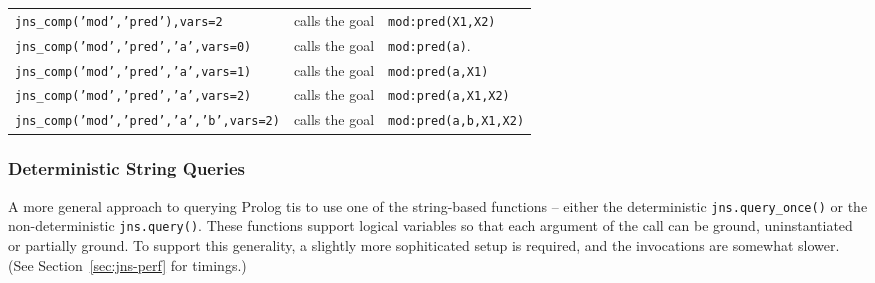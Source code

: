 \begin{example}
\begin{tabular}{lll}
  {\tt jns\_comp('mod','pred'),vars=2}       & calls the goal & {\tt mod:pred(X1,X2)} \\
  {\tt jns\_comp('mod','pred','a',vars=0)}   & calls the goal & {\tt mod:pred(a)}. \\
  {\tt jns\_comp('mod','pred','a',vars=1)}   & calls the goal & {\tt mod:pred(a,X1)} \\
  {\tt jns\_comp('mod','pred','a',vars=2)}   & calls the goal & {\tt mod:pred(a,X1,X2)} \\
  {\tt jns\_comp('mod','pred','a','b',vars=2)} & calls the goal & {\tt mod:pred(a,b,X1,X2)} \\
\end{tabular}
\end{example}


\subsubsection{Deterministic String Queries}

A more general approach to querying Prolog tis to use one of the string-based
functions -- either the deterministic {\tt jns.query\_once()} or the
non-deterministic {\tt jns.query()}.  These functions support logical
variables so that each argument of the call can be ground,
uninstantiated or partially ground.  To support this generality, a
slightly more sophiticated setup is required, and the invocations are
somewhat slower. (See Section~\ref{sec:jns-perf} for timings.)

